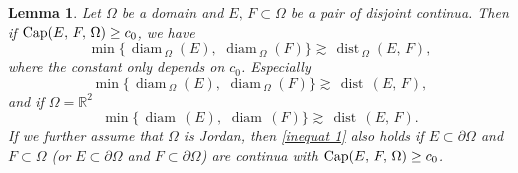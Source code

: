 \documentclass[reqno,11pt]{amsart}
\makeatletter
\def\dist{{\mathop\mathrm{\,dist\,}}}
\def\diam{{\mathop\mathrm{\,diam\,}}}
\newtheorem{lem}[thm]{Lemma}%
\numberwithin{equation}{section}
\theoremstyle{remark}
\makeatother
\begin{document}
\begin{lem}{\label{inner capacity}}
Let $\Omega$ be a domain and  $E,\,F\subset \Omega$ be a pair of disjoint continua. 
Then if ${\rm Cap}(E,\,F,\, \Omega)\ge c_0$, we have
\begin{equation}\label{inequat 1}
{\min\{\diam_{\Omega}(E),\,\diam_{\Omega}(F)\}}\gtrsim {\dist_{\Omega}(E,\,F)},
\end{equation}
where the constant only depends on $c_0$. Especially
$${\min\{\diam_{\Omega}(E),\,\diam_{\Omega}(F)\}}\gtrsim {\dist (E,\,F)}, $$
and if $\Omega=\mathbb R^2$
\begin{equation}\label{inequat 10}
\min\{\diam(E),\,\diam(F)\}\gtrsim {\dist (E,\,F)}.  
\end{equation}
If we further assume that $\Omega$ is Jordan, then \eqref{inequat 1} also holds if $E\subset \partial\Omega$ and $F\subset\Omega$ (or $E\subset \partial\Omega$ and $F\subset\partial\Omega$) are continua with ${\rm Cap}(E,\,F,\, \Omega)\ge c_0$. 
\end{lem}
\end{document}
